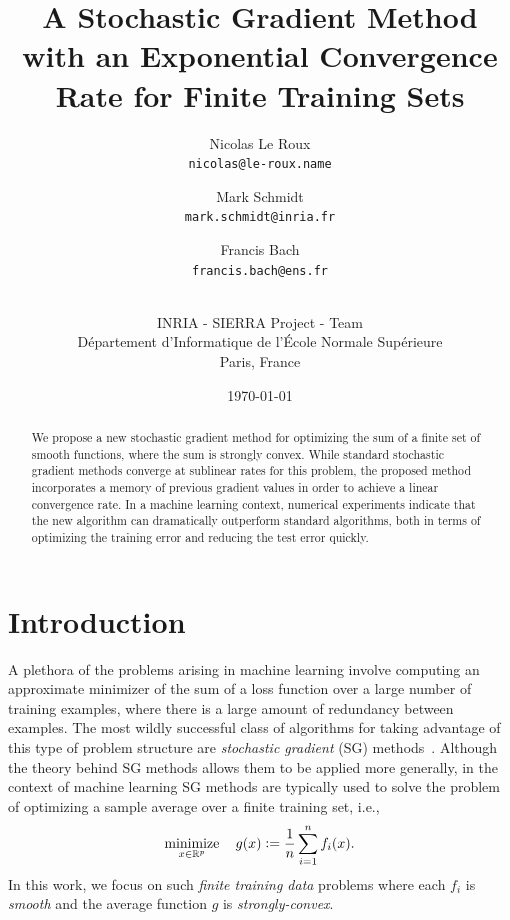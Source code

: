 \documentclass{article}
\title{A Stochastic Gradient Method with an Exponential Convergence
Rate for Finite Training Sets}
\author{
Nicolas Le Roux\\
\texttt{nicolas@le-roux.name}
\and
Mark Schmidt\\
\texttt{mark.schmidt@inria.fr}
\and
Francis Bach\\
\texttt{francis.bach@ens.fr}
\and
\\
INRIA - SIERRA Project - Team\\
D\'epartement d'Informatique de l'\'Ecole Normale Sup\'erieure\\
Paris, France
}
\date{\today}
\def\minim{\mathop{\hbox{minimize}}}
\def\minimize#1{\displaystyle\minim_{#1}}
\def\Real{\mathbb{R}}
\def\defd{\mathrel{\mathop:}=} %
\begin{document}
\maketitle
\begin{abstract}
We propose a new stochastic gradient method for optimizing the sum of
a finite set of smooth functions, where the sum is strongly convex.
While standard stochastic gradient methods
converge at sublinear rates for this problem, the proposed method incorporates a memory of previous gradient values in order to achieve a linear convergence
rate.  In a machine learning context, numerical experiments indicate that the new algorithm can dramatically outperform standard
algorithms, both in terms of optimizing the training error and reducing the test error quickly.
\end{abstract}
 
 
\section{Introduction}
\label{intro}

A plethora of the problems arising in machine learning involve computing an approximate minimizer of the sum of a loss function over a large number of training examples, where there is a large amount of redundancy between examples.  The most wildly successful class of algorithms for taking advantage of this type of problem structure are \emph{stochastic gradient} (SG) methods~\cite{robbins1951stochastic,bottou-lecun-2004}.
Although the theory behind SG methods allows them to be applied more generally, in the context of machine learning
SG methods are typically used to solve the problem of optimizing a sample average over a finite training set, i.e.,
\begin{equation}
\label{eq:1}
\minimize{x\in\Real^p}\quad g(x) \defd \frac{1}{n}\sum_{i=1}^n f_i(x).
\end{equation}
In this work, we focus on such \emph{finite training data} problems where
each $f_i$ is \emph{smooth} and the average function $g$ is
\emph{strongly-convex}.
\end{document}
